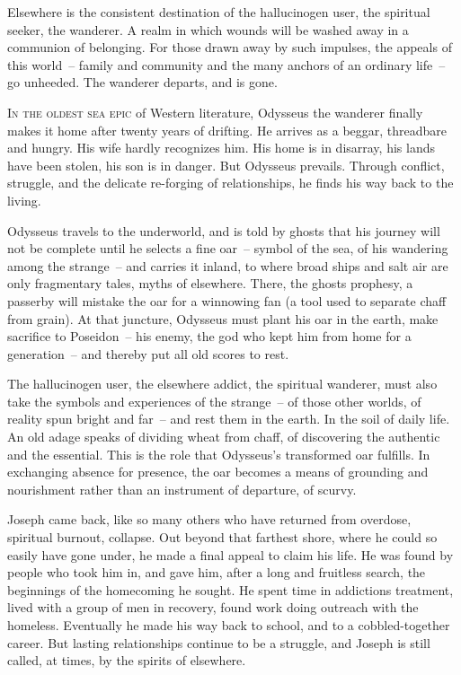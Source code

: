 \documentclass[10pt,DIV09,letterpaper,oneside,headsepline]{scrreprt}
\begin{document}
Elsewhere is the consistent destination of the hallucinogen user, the spiritual seeker, the wanderer. A realm in which wounds will be washed away in a communion of belonging. For those drawn away by such impulses, the appeals of this world~-- family and community and the many anchors of an ordinary life~-- go unheeded. The wanderer departs, and is gone.


\vspace{\baselineskip}
\lettrine[nindent=2pt]{\textcolor[gray]{0.1}{I}}{n the oldest sea epic }
of Western literature, Odysseus the wanderer finally makes it home after twenty years of drifting. He arrives as a beggar, threadbare and hungry. His wife hardly recognizes him. His home is in disarray, his lands have been stolen, his son is in danger. But Odysseus prevails. Through conflict, struggle, and the delicate re-forging of relationships, he finds his way back to the living.

Odysseus travels to the underworld, and is told by ghosts that his journey will not be complete until he selects a fine oar~-- symbol of the sea, of his wandering among the strange~-- and carries it inland, to where broad ships and salt air are only fragmentary tales, myths of elsewhere. There, the ghosts prophesy, a passerby will mistake the oar for a winnowing fan (a tool used to separate chaff from grain). At that juncture, Odysseus must plant his oar in the earth, make sacrifice to Poseidon~-- his enemy, the god who kept him from home for a generation~-- and thereby put all old scores to rest.

The hallucinogen user, the elsewhere addict, the spiritual wanderer, must also take the symbols and experiences of the strange~-- of those other worlds, of reality spun bright and far~-- and rest them in the earth. In the soil of daily life. An old adage speaks of dividing wheat from chaff, of discovering the authentic and the essential. This is the role that Odysseus's transformed oar fulfills. In exchanging absence for presence, the oar becomes a means of grounding and nourishment rather than an instrument of departure, of scurvy.

Joseph came back, like so many others who have returned from overdose, spiritual burnout, collapse. Out beyond that farthest shore, where he could so easily have gone under, he made a final appeal to claim his life. He was found by people who took him in, and gave him, after a long and fruitless search, the beginnings of the homecoming he sought. He spent time in addictions treatment, lived with a group of men in recovery, found work doing outreach with the homeless. Eventually he made his way back to school, and to a cobbled-together career. But lasting relationships continue to be a struggle, and Joseph is still called, at times, by the spirits of elsewhere.
\end{document}
